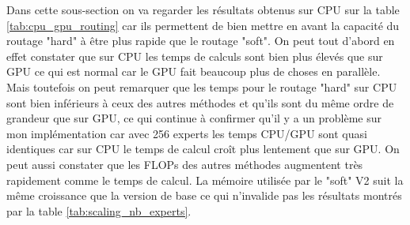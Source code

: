 \documentclass{article}
\begin{document}
Dans cette sous-section on va regarder les résultats obtenus sur CPU sur la table \ref{tab:cpu_gpu_routing} car ils permettent de bien mettre en avant la capacité du routage "hard" à être plus rapide que le routage "soft". On peut tout d'abord en effet constater que sur CPU les temps de calculs sont bien plus élevés que sur GPU ce qui est normal car le GPU fait beaucoup plus de choses en parallèle. Mais toutefois on peut remarquer que les temps pour le routage "hard" sur CPU sont bien inférieurs à ceux des autres méthodes et qu'ils sont du même ordre de grandeur que sur GPU, ce qui continue à confirmer qu'il y a un problème sur mon implémentation car avec 256 experts les temps CPU/GPU sont quasi identiques car sur CPU le temps de calcul croît plus lentement que sur GPU. On peut aussi constater que les FLOPs des autres méthodes augmentent très rapidement comme le temps de calcul. La mémoire utilisée par le "soft" V2 suit la même croissance que la version de base ce qui n'invalide pas les résultats montrés par la table \ref{tab:scaling_nb_experts}.
\end{document}

